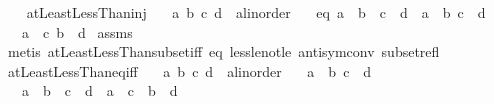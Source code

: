 \begin{isabellebody}
\ \ \isamarkupfalse%
%
\endisatagproof
{\isafoldproof}%
%
\isadelimproof
\isanewline
%
\endisadelimproof
\isanewline
{}\isamarkupfalse%
\ atLeastLessThan{\isacharunderscore}{\kern0pt}inj{\isacharcolon}{\kern0pt}\isanewline
\ \ \ a\ b\ c\ d\ {\isacharcolon}{\kern0pt}{\isacharcolon}{\kern0pt}\ {\isachardoublequoteopen}{\isacharprime}{\kern0pt}a{\isacharcolon}{\kern0pt}{\isacharcolon}{\kern0pt}linorder{\isachardoublequoteclose}\isanewline
\ \ \ eq{\isacharcolon}{\kern0pt}\ {\isachardoublequoteopen}{\isacharbraceleft}{\kern0pt}a\ {\isachardot}{\kern0pt}{\isachardot}{\kern0pt}{\isacharless}{\kern0pt}\ b{\isacharbraceright}{\kern0pt}\ {\isacharequal}{\kern0pt}\ {\isacharbraceleft}{\kern0pt}c\ {\isachardot}{\kern0pt}{\isachardot}{\kern0pt}{\isacharless}{\kern0pt}\ d{\isacharbraceright}{\kern0pt}{\isachardoublequoteclose}\ \ {\isachardoublequoteopen}a\ {\isacharless}{\kern0pt}\ b{\isachardoublequoteclose}\ {\isachardoublequoteopen}c\ {\isacharless}{\kern0pt}\ d{\isachardoublequoteclose}\isanewline
\ \ \ {\isachardoublequoteopen}a\ {\isacharequal}{\kern0pt}\ c{\isachardoublequoteclose}\ {\isachardoublequoteopen}b\ {\isacharequal}{\kern0pt}\ d{\isachardoublequoteclose}\isanewline
%
\isadelimproof
%
\endisadelimproof
%
\isatagproof
{}\isamarkupfalse%
\ assms\ \isamarkupfalse%
\ {\isacharparenleft}{\kern0pt}metis\ atLeastLessThan{\isacharunderscore}{\kern0pt}subset{\isacharunderscore}{\kern0pt}iff\ eq\ less{\isacharunderscore}{\kern0pt}le{\isacharunderscore}{\kern0pt}not{\isacharunderscore}{\kern0pt}le\ antisym{\isacharunderscore}{\kern0pt}conv{}\ subset{\isacharunderscore}{\kern0pt}refl{\isacharparenright}{\kern0pt}{\isacharplus}{\kern0pt}%
\endisatagproof
{\isafoldproof}%
%
\isadelimproof
\isanewline
%
\endisadelimproof
\isanewline
{}\isamarkupfalse%
\ atLeastLessThan{\isacharunderscore}{\kern0pt}eq{\isacharunderscore}{\kern0pt}iff{\isacharcolon}{\kern0pt}\isanewline
\ \ \ a\ b\ c\ d\ {\isacharcolon}{\kern0pt}{\isacharcolon}{\kern0pt}\ {\isachardoublequoteopen}{\isacharprime}{\kern0pt}a{\isacharcolon}{\kern0pt}{\isacharcolon}{\kern0pt}linorder{\isachardoublequoteclose}\isanewline
\ \ \ {\isachardoublequoteopen}a\ {\isacharless}{\kern0pt}\ b{\isachardoublequoteclose}\ {\isachardoublequoteopen}c\ {\isacharless}{\kern0pt}\ d{\isachardoublequoteclose}\isanewline
\ \ \ {\isachardoublequoteopen}{\isacharbraceleft}{\kern0pt}a\ {\isachardot}{\kern0pt}{\isachardot}{\kern0pt}{\isacharless}{\kern0pt}\ b{\isacharbraceright}{\kern0pt}\ {\isacharequal}{\kern0pt}\ {\isacharbraceleft}{\kern0pt}c\ {\isachardot}{\kern0pt}{\isachardot}{\kern0pt}{\isacharless}{\kern0pt}\ d{\isacharbraceright}{\kern0pt}\ {\isasymlongleftrightarrow}\ a\ {\isacharequal}{\kern0pt}\ c\ {\isasymand}\ b\ {\isacharequal}{\kern0pt}\ d{\isachardoublequoteclose}\isanewline

\end{isabellebody}
